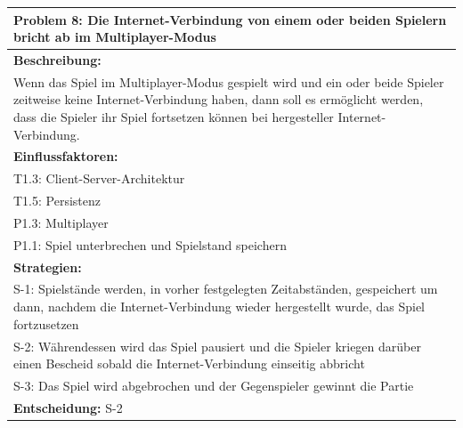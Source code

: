 \documentclass[fontsize=12pt,paper=a4,twoside]{scrartcl}
\begin{document}
\begin{longtable}{|p{15cm}|}
\hline
Problem 8: Die Internet-Verbindung von einem oder beiden Spielern bricht ab im Multiplayer-Modus                                                                        
\\ \hline                                                                                                                                                                                                                                                                                                                                                                                                                                                                                                                                                        
\textbf{Beschreibung:} \\
Wenn das Spiel im Multiplayer-Modus gespielt wird und ein oder beide Spieler zeitweise keine Internet-Verbindung haben, 
dann soll es ermöglicht werden, dass die Spieler ihr Spiel fortsetzen können bei hergesteller Internet-Verbindung. 
\\ \hline
\textbf{Einflussfaktoren:} \\
T1.3: Client-Server-Architektur \\
T1.5: Persistenz \\
P1.3: Multiplayer \\
P1.1: Spiel unterbrechen und Spielstand speichern
\\ \hline
\textbf{Strategien:} \\
S-1: Spielstände werden, in vorher festgelegten Zeitabständen, gespeichert um dann, nachdem die Internet-Verbindung wieder hergestellt wurde, das Spiel fortzusetzen\\
S-2: Währendessen wird das Spiel pausiert und die Spieler kriegen darüber einen Bescheid sobald die Internet-Verbindung einseitig abbricht \\
S-3: Das Spiel wird abgebrochen und der Gegenspieler gewinnt die Partie
 \\ \hline
 \textbf{Entscheidung:} S-2
\\ \hline
\end{longtable}
\end{document}
